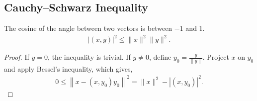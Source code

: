 \documentclass{amsart}
\theoremstyle{plain}
\numberwithin{equation}{section}
\begin{document}
\subsection*{Cauchy--Schwarz Inequality}
The cosine of the angle between two vectors is 
between $-1$ and $1$. 
\begin{align*}
|(x, y)|^2 \leq \|x\|^2 \|y\|^2.
\end{align*}

\begin{proof}
If $y=0$, the inequality is trivial. If $y\neq 0$, define
$y_0 = \frac{y}{\|y\|}$. Project $x$ on $y_0$ and apply
Bessel's inequality, which gives,
\begin{align*}
0 \leq \left\|x - (x, y_0) y_0\right\|^2 = 
\|x\|^2 - |(x, y_0)|^2.
\end{align*}
\end{proof}
\end{document}
